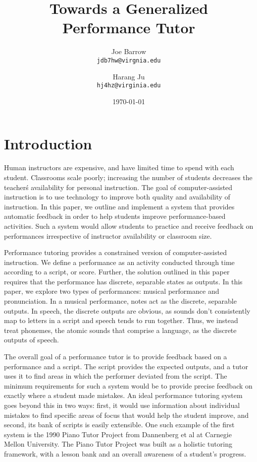 \documentclass[twocolumn]{article}
\title{Towards a Generalized Performance Tutor}
\author{
  Joe Barrow\\
  \texttt{jdb7hw@virgnia.edu}
  \and
  Harang Ju\\
  \texttt{hj4hz@virginia.edu}}
\date{\today}
\begin{document}
\maketitle

\begin{abstract}


\end{abstract}

\section{Introduction}

Human instructors are expensive, and have limited time to spend with each student. Classrooms scale poorly; increasing the number of students decreases the teacher\'s availability for personal instruction. The goal of computer-assisted instruction is to use technology to improve both quality and availability of instruction. In this paper, we outline and implement a system that provides automatic feedback in order to help students improve performance-based activities. Such a system would allow students to practice and receive feedback on performances irrespective of instructor availability or classroom size.

Performance tutoring provides a constrained version of computer-assisted instruction. We define a performance as an activity conducted through time according to a script, or score. Further, the solution outlined in this paper requires that the performance has discrete, separable states as outputs. In this paper, we explore two types of performances: musical performance and pronunciation. In a musical performance, notes act as the discrete, separable outputs. In speech, the discrete outputs are obvious, as sounds don’t consistently map to letters in a script and speech tends to run together. Thus, we instead treat phonemes, the atomic sounds that comprise a language, as the discrete outputs of speech.
 
The overall goal of a performance tutor is to provide feedback based on a performance and a script. The script provides the expected outputs, and a tutor uses it to find areas in which the performer deviated from the script. The minimum requirements for such a system would be to provide precise feedback on exactly where a student made mistakes. An ideal performance tutoring system goes beyond this in two ways: first, it would use information about individual mistakes to find specific areas of focus that would help the student improve, and second, its bank of scripts is easily extensible. One such example of the first system is the 1990 Piano Tutor Project from Dannenberg et al at Carnegie Mellon University. The Piano Tutor Project was built as a holistic tutoring framework, with a lesson bank and an overall awareness of a student’s progress.
\end{document}
